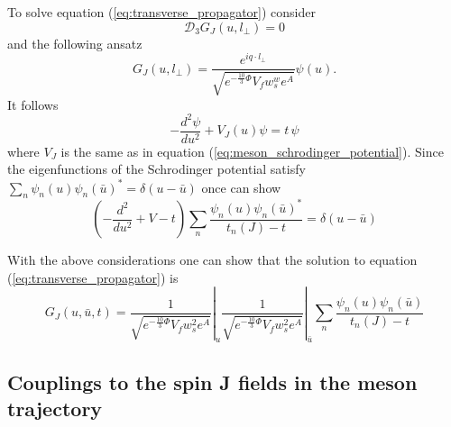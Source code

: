 \documentclass[a4paper,12pt]{article}
\begin{document}
To solve equation (\ref{eq:transverse_propagator}) consider
\begin{equation}
\mathcal{D}_3 G_J\left(u, l_\perp\right) = 0
\end{equation}
and the following ansatz
\begin{equation}
G_J\left(u, l_\perp\right) = \frac{e^{i q \cdot l_\perp}}{\sqrt{e^{-\frac{10}{3}\Phi}V_f w_s^w e^{A}}} \psi\left(u\right).
\end{equation}
It follows
\begin{equation}
- \frac{d^2 \psi}{d u^2} + V_J \left(u\right) \psi = t \, \psi
\end{equation}
where $V_J$ is the same as in equation (\ref{eq:meson_schrodinger_potential}). Since the eigenfunctions of the Schrodinger potential satisfy $\sum_n \psi_n (u) {\psi_n (\bar{u})}^* = \delta(u - \bar{u})$ once can show
\begin{equation}
\left( - \frac{d^2}{du^2} + V - t \right) \sum_n \frac{\psi_n\left(u\right) {\psi_n\left(\bar{u}\right)}^*}{t_n \left(J\right) - t} = \delta\left(u - \bar{u} \right)
\end{equation}

With the above considerations one can show that the solution to equation (\ref{eq:transverse_propagator}) is
\begin{equation}
G_J \left(u, \bar{u}, t \right) = \left. \frac{1}{\sqrt{e^{-\frac{10}{3}\Phi}V_f w_s^2 e^A}}\right|_u  \left.\frac{1}{\sqrt{e^{-\frac{10}{3}\Phi}V_f w_s^2 e^A}}\right|_{\bar{u}}  \sum_n \frac{\psi_n\left(u\right) \psi_n \left(\bar{u}\right)}{t_n\left(J\right) - t}
\end{equation}

\subsection{Couplings to the spin J fields in the meson trajectory}
\end{document}
